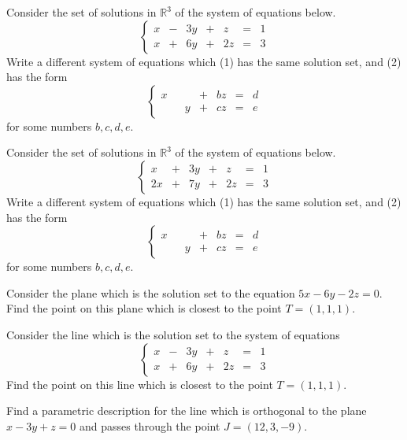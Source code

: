\documentclass[cahier-main.tex]{subfiles}
\begin{document}
\begin{challenge}
Consider the set of solutions in $\mathbb{R}^3$ of the system of equations below. 
\[
\left\{\begin{array}{rrrrrrr}
x & - & 3y & + & z & = & 1 \\
x & + & 6y & + & 2z & = & 3
\end{array}\right.
\]
Write a different system of equations which (1) has the same solution set, and (2) has the form
\[
\left\{\begin{array}{rrrrrrr}
x &  &  & + & bz & = & d \\
 &  & y & + & cz & = & e
\end{array}\right.
\]
for some numbers $b,c,d,e$.
\end{challenge}

\begin{challenge}
Consider the set of solutions in $\mathbb{R}^3$ of the system of equations below. 
\[
\left\{\begin{array}{rrrrrrr}
x & + & 3y & + & z & = & 1 \\
2x & + & 7y & + & 2z & = & 3
\end{array}\right.
\]
Write a different system of equations which (1) has the same solution set, and (2) has the form
\[
\left\{\begin{array}{rrrrrrr}
x &  &  & + & bz & = & d \\
 &  & y & + & cz & = & e
\end{array}\right.
\]
for some numbers $b,c,d,e$.
\end{challenge}

\begin{challenge}
Consider the plane which is the solution set to the equation $5x-6y-2z=0$. Find the point on this plane which is closest to the point $T = (1,1,1)$.
\end{challenge}

\begin{challenge}
Consider the line which is the solution set to the system of equations
\[
\left\{\begin{array}{rrrrrrr}
x & - & 3y & + & z & = & 1 \\
x & + & 6y & + & 2z & = & 3
\end{array}\right.
\]
Find the point on this line which is closest to the point $T = (1,1,1)$.
\end{challenge}

\begin{challenge}
Find a parametric description for the line which is orthogonal to the plane $x-3y+z=0$ and passes through the point $J = (12,3,-9)$.
\end{challenge}
\end{document}
